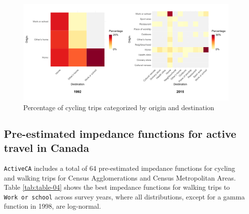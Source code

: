 \documentclass[Royal,times,sageh]{sagej}
\begin{document}
\begin{figure}

{\centering \includegraphics[width=1\linewidth]{Manuscript-figures/cycling_hm_fig} 

}

\caption{Percentage of cycling trips categorized by origin and destination}\label{fig:figure-02}
\end{figure}

\hypertarget{pre-estimated-impedance-functions-for-active-travel-in-canada}{%
\subsection{Pre-estimated impedance functions for active travel in
Canada}\label{pre-estimated-impedance-functions-for-active-travel-in-canada}}

\texttt{ActiveCA} includes a total of 64 pre-estimated impedance
functions for cycling and walking trips for Census Agglomerations and
Census Metropolitan Areas. Table \ref{tab:table-04} shows the best
impedance functions for walking trips to \texttt{Work\ or\ school}
across survey years, where all distributions, except for a gamma
function in 1998, are log-normal.
\end{document}
